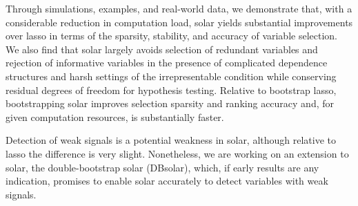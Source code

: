 \documentclass[11pt,review,authoryear]{elsarticle}
\begin{document}
Through simulations, examples, and real-world data, we demonstrate that, with a considerable reduction in computation load, solar yields substantial improvements over lasso in terms of the sparsity, stability, and accuracy of variable selection. We also find that solar largely avoids selection of redundant variables and rejection of informative variables in the presence of complicated dependence structures and harsh settings of the irrepresentable condition while conserving residual degrees of freedom for hypothesis testing. Relative to bootstrap lasso, bootstrapping solar improves selection sparsity and ranking accuracy and, for given computation resources, is substantially faster.

Detection of weak signals is a potential weakness in solar, although relative to lasso the difference is very slight. Nonetheless, we are working on an extension to solar, the double-bootstrap solar (DBsolar), which, if early results are any indication, promises to enable solar accurately to detect variables with weak signals.



%


\end{document}
